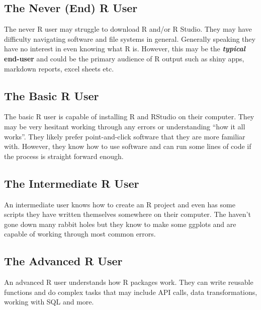 \documentclass[
]{book}
\begin{document}
\subsection*{The Never (End) R User}\label{the-never-end-r-user}

The never R user may struggle to download R and/or R Studio. They may have difficulty navigating software and file systems in general. Generally speaking they have no interest in even knowing what R is. However, this may be the \textbf{\emph{typical}} \textbf{end-user} and could be the primary audience of R output such as shiny apps, markdown reports, excel sheets etc.

\subsection*{The Basic R User}\label{the-basic-r-user}

The basic R user is capable of installing R and RStudio on their computer. They may be very hesitant working through any errors or understanding ``how it all works''. They likely prefer point-and-click software that they are more familiar with. However, they know how to use software and can run some lines of code if the process is straight forward enough.

\subsection*{The Intermediate R User}\label{the-intermediate-r-user}

An intermediate user knows how to create an R project and even has some scripts they have written themselves somewhere on their computer. The haven't gone down many rabbit holes but they know to make some ggplots and are capable of working through most common errors.

\subsection*{The Advanced R User}\label{the-advanced-r-user}

An advanced R user understands how R packages work. They can write reusable functions and do complex tasks that may include API calls, data transformations, working with SQL and more.
\end{document}
